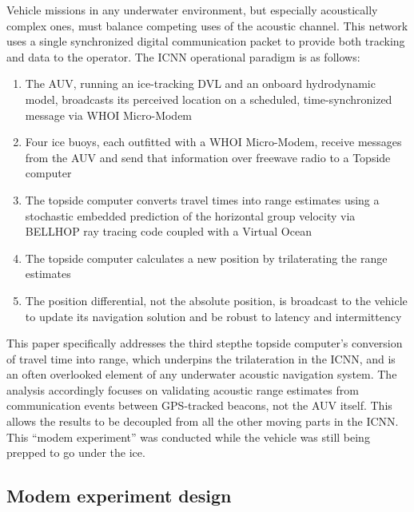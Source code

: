 Vehicle missions in any underwater environment, but especially acoustically complex ones, must balance competing uses of the acoustic channel.
This network uses a single synchronized digital communication packet to provide both tracking and data to the operator.
The ICNN operational paradigm is as follows:
\begin{enumerate}
\item The AUV, running an ice-tracking DVL and an onboard hydrodynamic model, broadcasts its perceived location on a scheduled, time-synchronized message via WHOI Micro-Modem
\item Four ice buoys, each outfitted with a WHOI Micro-Modem, receive messages from the AUV and send that information over freewave radio to a Topside computer
\item The topside computer converts travel times into range estimates using a stochastic embedded prediction of the horizontal group velocity via BELLHOP ray tracing code \citep{porter_bellhop_2011} coupled with a Virtual Ocean \citep{schneider_netsim_2018}
\item The topside computer calculates a new position by trilaterating the range estimates
\item The position differential, not the absolute position, is broadcast to the vehicle to update its navigation solution and be robust to latency and intermittency
\end{enumerate}

This paper specifically addresses the third step\textemdash the topside computer's conversion of travel time into range, which underpins the trilateration in the ICNN, and is an often overlooked element of any underwater acoustic navigation system.
The analysis accordingly focuses on validating acoustic range estimates from communication events between GPS-tracked beacons, not the AUV itself.
This allows the results to be decoupled from all the other moving parts in the ICNN.
This ``modem experiment'' was conducted while the vehicle was still being prepped to go under the ice.

\subsection{Modem experiment design}


